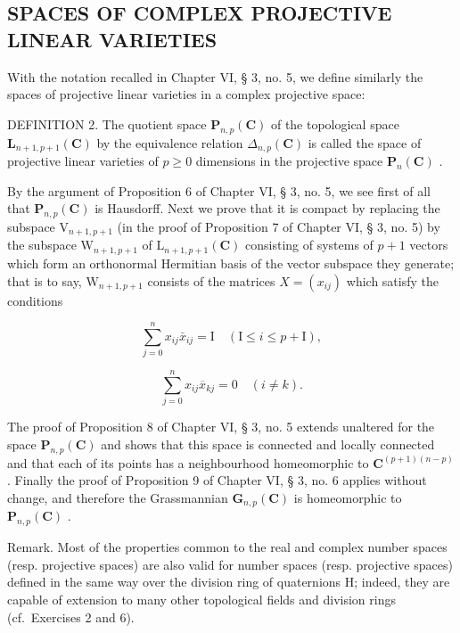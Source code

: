 \subsection{SPACES OF COMPLEX PROJECTIVE LINEAR VARIETIES}

With the notation recalled in Chapter VI, § 3, no. 5, we define similarly the spaces of projective linear varieties in a complex projective space:

DEFINITION 2. The quotient space \(\mathbf{P}_{n,p}(\mathbf{C})\) of the topological space \(\mathbf{L}_{n+1, p+1}(\mathbf{C})\) by the equivalence relation \(\Delta_{n,p}(\mathbf{C})\) is called the space of projective linear varieties of \(p \geqslant 0\) dimensions in the projective space \(\mathbf{P}_n(\mathbf{C})\) .

By the argument of Proposition 6 of Chapter VI, § 3, no. 5, we see first of all that \(\mathbf{P}_{n,p}(\mathbf{C})\) is Hausdorff. Next we prove that it is compact by replacing the subspace \(\mathrm{V}_{n+1,p+1}\) (in the proof of Proposition 7 of Chapter VI, § 3, no. 5) by the subspace \(\mathrm{W}_{n+1,p+1}\) of \(\mathrm{L}_{n+1,p+1}(\mathbf{C})\) consisting of systems of \(p+1\) vectors which form an orthonormal Hermitian basis of the vector subspace they generate; that is to say, \(\mathrm{W}_{n+1,p+1}\) consists of the matrices \(X=(x_{ij})\) which satisfy the conditions

\[
\sum_ {j = 0} ^ {n} x _ {i j} \bar {x} _ {i j} = \mathrm{I} \quad (\mathrm{I} \leqslant i \leqslant p + \mathrm{I}),
\]

\[
\sum_ {j = 0} ^ {n} x _ {i j} \overline {{{x}}} _ {k j} = 0 \quad (i \neq k).
\]

The proof of Proposition 8 of Chapter VI, § 3, no. 5 extends unaltered for the space \(\mathbf{P}_{n,p}(\mathbf{C})\) and shows that this space is connected and locally connected and that each of its points has a neighbourhood homeomorphic to \(\mathbf{C}^{(p+1)(n-p)}\) . Finally the proof of Proposition 9 of Chapter VI, § 3, no. 6 applies without change, and therefore the Grassmannian \(\mathbf{G}_{n,p}(\mathbf{C})\) is homeomorphic to \(\mathbf{P}_{n,p}(\mathbf{C})\) .

Remark. Most of the properties common to the real and complex number spaces (resp. projective spaces) are also valid for number spaces (resp. projective spaces) defined in the same way over the division ring of quaternions H; indeed, they are capable of extension to many other topological fields and division rings (cf.~Exercises 2 and 6).

\ExerciseGroupsStart
\relax{}
